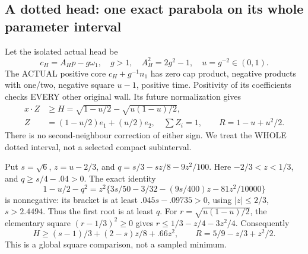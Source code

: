 \documentclass[11pt]{article}
\theoremstyle{definition}
\theoremstyle{remark}
\begin{document}
\subsection{A dotted head: one exact parabola on its whole parameter interval}
\label{app:exact19:Ddottedhead}

Let the isolated actual head be
\[
 c_H=A_Hp-g\omega_1,\quad g>1,\quad A_H^2=2g^2-1,\quad
                                       u=g^{-2}\in(0,1).
\]
The ACTUAL positive core \(c_H+g^{-1}n_1\) has zero cap product,
negative products with one/two, negative square \(u-1\), positive time.
Positivity of its coefficients checks EVERY other original wall.
Its future normalization gives
\[
\begin{split}
 x\cdot Z&\ge H=\sqrt{1-u/2}-\sqrt{u(1-u)/2},\\
 Z&=(1-u/2)e_1+(u/2)e_2,\quad\sum Z_i=1,\qquad R=1-u+u^2/2 .
\end{split}
\]
There is no second-neighbour correction of either sign.
We treat the WHOLE dotted interval, not a selected compact subinterval.

Put \(s=\sqrt6\), \(z=u-2/3\), and
\(q=s/3-sz/8-9z^2/100\).
Here \(-2/3<z<1/3\), and \(q\ge s/4-.04>0\).
The exact identity
\[
 1-u/2-q^2
   =z^2\{3s/50-3/32-(9s/400)z-81z^2/10000\}
\]
is nonnegative: its bracket is at least
\(.045s-.09735>0\), using \(|z|\le2/3\), \(s>2.4494\).
Thus the first root is at least \(q\).
For \(r=\sqrt{u(1-u)/2}\), the elementary square
\((r-1/3)^2\ge0\) gives \(r\le1/3-z/4-3z^2/4\).
Consequently
\[
 H\ge(s-1)/3+(2-s)z/8+.66z^2,\qquad
 R=5/9-z/3+z^2/2 .
\tag{D19headparabola}\label{app:exact19:eq:Dheadparabola}
\]
This is a global square comparison, not a sampled minimum.
\end{document}
